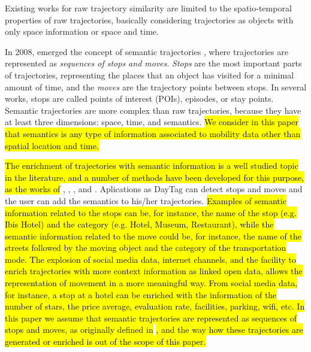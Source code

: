 \documentclass[12pt]{article}
\begin{document}
Existing works for raw trajectory similarity are limited to the spatio-temporal properties of raw trajectories, basically considering trajectories as objects with only space information or space and time.

In 2008, emerged the concept of semantic trajectories \citep{Spaccapietra:2008:CVT:1347466.1347785}, where trajectories are represented as \emph{sequences of stops and moves}. \emph{Stops} are the most important parts of trajectories, representing the places that an object has visited for a minimal amount of time, and the \emph{moves} are the trajectory points between stops. In several works, stops are called points of interest (POIs), episodes, or stay points. Semantic trajectories are more complex than raw trajectories, because they have at least three dimensions: space, time, and semantics. \hl{We consider in this paper that semantics is any type of information associated to mobility data other than spatial location and time.}

\hl{The enrichment of trajectories with semantic information is a well studied topic in the literature, and a number of methods have been developed for this purpose, as the works of} \cite{alvares2007model}, \cite{Palma2008}, \cite{manso}, and \cite{fileto2013baquara}. Aplications as DayTag \cite{fernando2013} can detect stops and moves and the user can add the semantics to his/her trajectories. \hl{Examples of semantic information related to the stops can be, for instance, the name of the stop (e.g. Ibis Hotel) and the category (e.g. Hotel, Museum, Restaurant), while the semantic information related to the move could be, for instance, the name of the streets followed by the moving object and the category of the transportation mode. The explosion of social media data, internet channels, and the facility to enrich trajectories with more context information as linked open data, allows the representation of movement in a more meaningful way. From social media data, for instance, a stop at a hotel can be enriched with the information of the number of stars, the price average, evaluation rate, facilities, parking, wifi, etc.  In this paper we assume that semantic trajectories are represented as sequences of stops and moves, as originally defined in }\cite{Spaccapietra:2008:CVT:1347466.1347785}\hl{, and the way how these trajectories are generated or enriched is out of the scope of this paper.}
\end{document}
